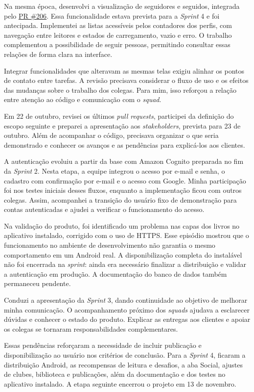 Na mesma época, desenvolvi a visualização de seguidores e seguidos, integrada pelo \href{https://github.com/ReadRace-AGES/ReadRace/pull/206}{PR \#206}. Essa funcionalidade estava prevista para a \textit{Sprint} 4 e foi antecipada. Implementei as listas acessíveis pelos contadores dos perfis, com navegação entre leitores e estados de carregamento, vazio e erro. O trabalho complementou a possibilidade de seguir pessoas, permitindo consultar essas relações de forma clara na interface.

Integrar funcionalidades que alteravam as mesmas telas exigiu alinhar os pontos de contato entre tarefas. A revisão precisava considerar o fluxo de uso e os efeitos das mudanças sobre o trabalho dos colegas. Para mim, isso reforçou a relação entre atenção ao código e comunicação com o \textit{squad}.

Em 22 de outubro, revisei os últimos \textit{pull requests}, participei da definição do escopo seguinte e preparei a apresentação aos \textit{stakeholders}, prevista para 23 de outubro. Além de acompanhar o código, precisava organizar o que seria demonstrado e conhecer os avanços e as pendências para explicá-los aos clientes.

A autenticação evoluiu a partir da base com Amazon Cognito preparada no fim da \textit{Sprint} 2. Nesta etapa, a equipe integrou o acesso por e-mail e senha, o cadastro com confirmação por e-mail e o acesso com Google. Minha participação foi nos testes iniciais desses fluxos, enquanto a implementação ficou com outros colegas. Assim, acompanhei a transição do usuário fixo de demonstração para contas autenticadas e ajudei a verificar o funcionamento do acesso.

Na validação do produto, foi identificado um problema nas capas dos livros no aplicativo instalado, corrigido com o uso de \ac{HTTPS}. Esse episódio mostrou que o funcionamento no ambiente de desenvolvimento não garantia o mesmo comportamento em um Android real. A disponibilização completa do instalável não foi encerrada na \textit{sprint}: ainda era necessário finalizar a distribuição e validar a autenticação em produção. A documentação do banco de dados também permaneceu pendente.

Conduzi a apresentação da \textit{Sprint} 3, dando continuidade ao objetivo de melhorar minha comunicação. O acompanhamento próximo dos \textit{squads} ajudava a esclarecer dúvidas e conhecer o estado do produto. Explicar as entregas aos clientes e apoiar os colegas se tornaram responsabilidades complementares.

Essas pendências reforçaram a necessidade de incluir publicação e disponibilização ao usuário nos critérios de conclusão. Para a \textit{Sprint} 4, ficaram a distribuição Android, as recompensas de leitura e desafios, a aba Social, ajustes de clubes, biblioteca e publicações, além da documentação e dos testes no aplicativo instalado. A etapa seguinte encerrou o projeto em 13 de novembro.
